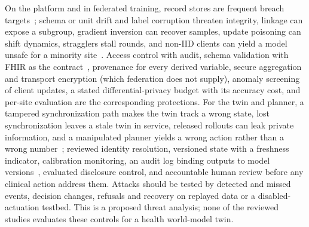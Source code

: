 \documentclass[journal]{IEEEtran}
\begin{document}
On the platform and in federated training, record stores are frequent breach targets~\cite{Seh2020HealthcareDataBreaches}; schema or unit drift and label corruption threaten integrity, linkage can expose a subgroup, gradient inversion can recover samples, update poisoning can shift dynamics, stragglers stall rounds, and non-IID clients can yield a model unsafe for a minority site~\cite{nguyen2022FLsmarthealthcare,aouedi2022FLmedical}. Access control with audit, schema validation with FHIR as the contract~\cite{ayaz2021fhir}, provenance for every derived variable, secure aggregation and transport encryption (which federation does not supply), anomaly screening of client updates, a stated differential-privacy budget with its accuracy cost, and per-site evaluation are the corresponding protections. For the twin and planner, a tampered synchronization path makes the twin track a wrong state, lost synchronization leaves a stale twin in service, released rollouts can leak private information, and a manipulated planner yields a wrong action rather than a wrong number~\cite{maes2026leworldmodel}; reviewed identity resolution, versioned state with a freshness indicator, calibration monitoring, an audit log binding outputs to model versions~\cite{Sel2025VVUQ}, evaluated disclosure control, and accountable human review before any clinical action address them. Attacks should be tested by detected and missed events, decision changes, refusals and recovery on replayed data or a disabled-actuation testbed. This is a proposed threat analysis; none of the reviewed studies evaluates these controls for a health world-model twin.
\end{document}
